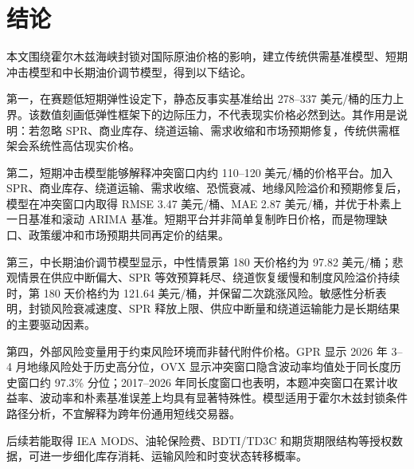 \section{结论}

本文围绕霍尔木兹海峡封锁对国际原油价格的影响，建立传统供需基准模型、短期冲击模型和中长期油价调节模型，得到以下结论。

第一，在赛题低短期弹性设定下，静态反事实基准给出 278--337 美元/桶的压力上界。该数值刻画低弹性框架下的边际压力，不代表现实价格必然到达。其作用是说明：若忽略 SPR、商业库存、绕道运输、需求收缩和市场预期修复，传统供需框架会系统性高估现实价格。

第二，短期冲击模型能够解释冲突窗口内约 110--120 美元/桶的价格平台。加入 SPR、商业库存、绕道运输、需求收缩、恐慌衰减、地缘风险溢价和预期修复后，模型在冲突窗口内取得 RMSE 3.47 美元/桶、MAE 2.87 美元/桶，并优于朴素上一日基准和滚动 ARIMA 基准。短期平台并非简单复制昨日价格，而是物理缺口、政策缓冲和市场预期共同再定价的结果。

第三，中长期油价调节模型显示，中性情景第 180 天价格约为 97.82 美元/桶；悲观情景在供应中断偏大、SPR 等效预算耗尽、绕道恢复缓慢和制度风险溢价持续时，第 180 天价格约为 121.64 美元/桶，并保留二次跳涨风险。敏感性分析表明，封锁风险衰减速度、SPR 释放上限、供应中断量和绕道运输能力是长期结果的主要驱动因素。

第四，外部风险变量用于约束风险环境而非替代附件价格。GPR 显示 2026 年 3--4 月地缘风险处于历史高分位，OVX 显示冲突窗口隐含波动率均值处于同长度历史窗口约 97.3\% 分位；2017--2026 年同长度窗口也表明，本题冲突窗口在累计收益率、波动率和朴素基准误差上均具有显著特殊性。模型适用于霍尔木兹封锁条件路径分析，不宜解释为跨年份通用短线交易器。

后续若能取得 IEA MODS、油轮保险费、BDTI/TD3C 和期货期限结构等授权数据，可进一步细化库存消耗、运输风险和时变状态转移概率。
